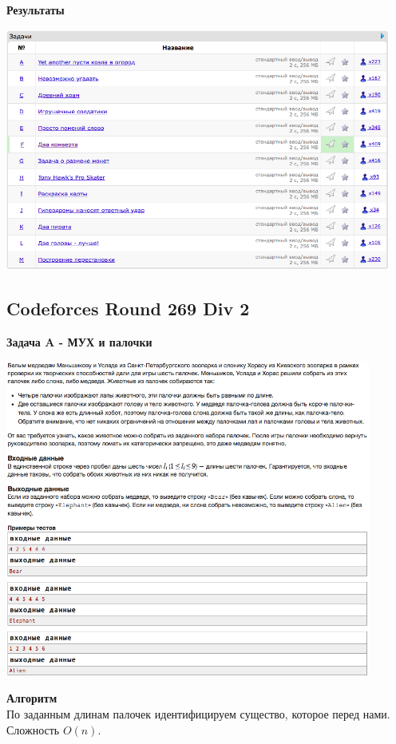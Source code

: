 \documentclass[a4paper,12pt]{article}
\begin{document}
\newpage
\textbf{{\large Результаты}} \\
\begin{center}
\includegraphics[width=0.95\textwidth]{CT_SGAU/A_CT_SGAU_result.png}\\ [1cm]
\end{center}


%
%

\newpage
\subsection{Codeforces Round 269 Div 2}

\textbf{{\large Задача A - МУХ и палочки}} \\
\begin{center}
\includegraphics[width=0.9\textwidth]{C_269/C_269_A.png}\\ [1cm]
\end{center}
\textbf{{\large Алгоритм}} \\
По заданным длинам палочек идентифицируем существо, которое перед нами. Сложность $O(n)$.\\
\end{document}
